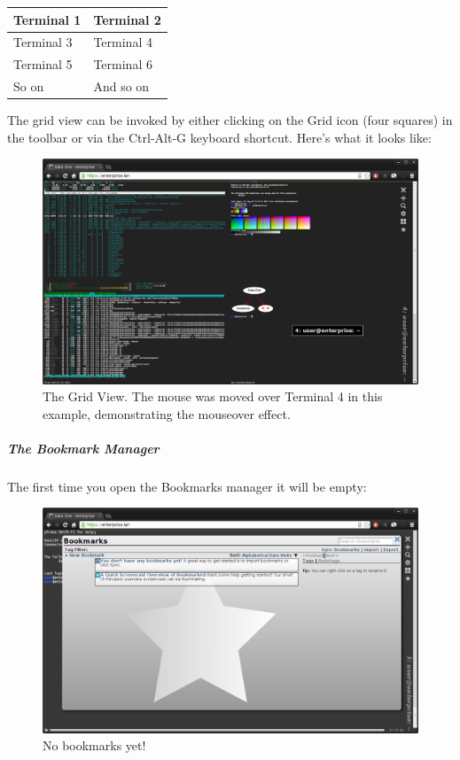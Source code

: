 \documentclass[letterpaper,10pt,openany]{sphinxmanual}
\begin{document}
\begin{tabulary}{\linewidth}{|L|L|}
\hline

Terminal 1
 & 
Terminal 2
\\
\hline
Terminal 3
 & 
Terminal 4
\\
\hline
Terminal 5
 & 
Terminal 6
\\
\hline
So on
 & 
And so on
\\
\hline\end{tabulary}


The grid view can be invoked by either clicking on the Grid icon (four squares) in the toolbar or via the Ctrl-Alt-G keyboard shortcut.  Here's what it looks like:
\begin{figure}[htbp]
\centering
\capstart

\includegraphics{gateone_grid_view.png}
\caption{The Grid View.  The mouse was moved over Terminal 4 in this example, demonstrating the mouseover effect.}\end{figure}


\subparagraph{The Bookmark Manager}
\label{Applications/terminal/userguide:the-bookmark-manager}
The first time you open the Bookmarks manager it will be empty:
\begin{figure}[htbp]
\centering
\capstart

\includegraphics{gateone_bookmarks_empty.png}
\caption{No bookmarks yet!}\end{figure}
\end{document}
